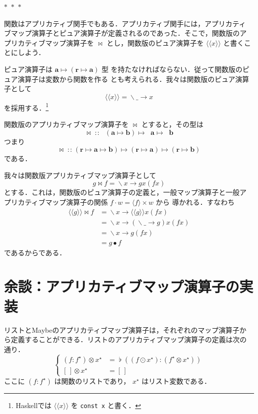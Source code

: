 \documentclass[a5paper,twoside,fleqn,draft]{jsbook}
\newcommand{\Langle}{\langle\!\langle}
\newcommand{\Rangle}{\rangle\!\rangle}
\newcommand{\separator}{\begin{center}$*$~$*$~$*$\end{center}}
\newcommand{\programminglanguage}[1]{\textsf{#1}}
\newcommand{\haskell}{\programminglanguage{Haskell}}
\newcommand{\code}[1]{\texttt{#1}}
\newcommand{\mEmptyList}{{[\,]}}
\newcommand{\mAnyParam}{\_}
\DeclareMathOperator{\mAppMap}{\times}
\DeclareMathOperator{\mAppMapFunc}{\bowtie}
\DeclareMathOperator{\mAppMapList}{\otimes}
\DeclareMathOperator{\mComp}{\bullet} %
\DeclareMathOperator{\mConcat}{\flat}
\DeclareMathOperator{\mIn}{{:\!:}}
\DeclareMathOperator{\mLambda}{\backslash}
\DeclareMathOperator{\mLambdaArrow}{\rightarrow}
\DeclareMathOperator{\mMap}{\cdot} %
\DeclareMathOperator{\mMapList}{\odot}
\DeclareMathOperator{\mMapsTo}{\mapsto}
\newcommand{\mType}[1]{\mathbf{#1}}
\newcommand{\mTypeConstructor}[1]{\textit{#1}}
\newcommand{\mFuncTypeConstructor}[1]{\mathop{\mTypeConstructor{Func}_{(\mType{#1})}}}
\newcommand{\mFuncWith}[1]{\Langle#1\Rangle}
\newcommand{\mPureWith}[1]{\langle#1\rangle}
\newcommand{\mList}[1]{{#1}^\mathrm{\star}}
\newcommand{\mLambdaExp}[2]{\mLambda{#1}\mLambdaArrow{#2}}
\newcommand{\mProj}[2]{#1\mMapsTo#2}
\begin{document}
\separator

関数はアプリカティブ関手でもある．アプリカティブ関手には，アプリカティ
ブマップ演算子とピュア演算子が定義されるのであった．そこで，関数版のア
プリカティブマップ演算子を $\mAppMapFunc$ とし，関数版のピュア演算子を
$\mFuncWith{x}$ と書くことにしよう．

ピュア演算子は $\mProj{\mType{a}}{(\mProj{\mType{r}}{\mType{a}})}$ 型
を持たなければならない．従って関数版のピュア演算子は変数から関数を作る
とも考えられる．我々は関数版のピュア演算子として
\begin{equation}
\mFuncWith{x}=\mLambdaExp{\mAnyParam}{x}
\end{equation}
を採用する．\footnote{\haskell では $\mFuncWith{x}$ を \code{const x} と書く．}

関数版のアプリカティブマップ演算子を $\mAppMapFunc$ とすると，その型は
\begin{equation}
\mAppMapFunc
\mIn
\mProj{
  \mProj{
    \mFuncTypeConstructor{r}(\mProj{\mType{a}}{\mType{b}})
  }
  {
    \mFuncTypeConstructor{r}\mType{a}
  }
}
{
  \mFuncTypeConstructor{r}\mType{b}
}
\end{equation}
つまり
\begin{equation}
\mAppMapFunc
\mIn{}
\mProj{
  \mProj{
    (\mProj{\mType{r}}{\mProj{\mType{a}}{\mType{b}}})
  }
  {
    (\mProj{\mType{r}}{\mType{a}})
  }
}
{
  (\mProj{\mType{r}}{\mType{b}})
}
\end{equation}
である．

我々は関数版アプリカティブマップ演算子として
\begin{equation}
g\mAppMapFunc f=\mLambdaExp{x}{gx(fx)}
\end{equation}
とする．これは，関数版のピュア演算子の定義と，一般マップ演算子と一般ア
プリカティブマップ演算子の関係 $f\mMap w=\mPureWith{f}\mAppMap w$ から
導かれる．すなわち
\begin{align}
\mFuncWith{g}\mAppMapFunc f
&=\mLambdaExp{x}{\mFuncWith{g}x(fx)}\\
&=\mLambdaExp{x}{(\mLambdaExp{\mAnyParam}{g})x(fx)}\\
&=\mLambdaExp{x}{g(fx)}\\
&=g\mComp f
\end{align}
であるからである．

\section{余談：アプリカティブマップ演算子の実装}

リストとMaybeのアプリカティブマップ演算子は，それぞれのマップ演算子か
ら定義することができる．リストのアプリカティブマップ演算子の定義は次の
通り．
\begin{equation}
\left\{
\begin{aligned}
(f:\mList{f})\mAppMapList\mList{x}&=\mConcat{}((f\mMapList\mList{x}):(\mList{f}\mAppMapList\mList{x}))\\
\mEmptyList\mAppMapList\mList{x}&=\mEmptyList
\end{aligned}
\right.
\end{equation}
ここに $(f:\mList{f})$ は関数のリストであり， $\mList{x}$ はリスト変数である．
\end{document}
